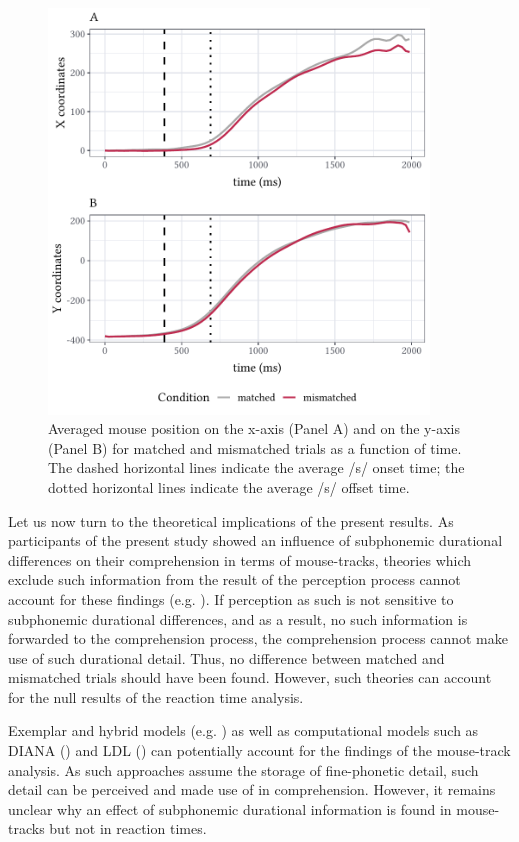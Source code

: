 \begin{figure}
    \centering
    \includegraphics[width=0.9\textwidth]{figures/fig7.12.pdf}
    \caption{Averaged mouse position on the x-axis (Panel A) and on the y-axis (Panel B) for matched and mismatched trials as a function of time. The dashed horizontal lines indicate the average /s/ onset time; the dotted horizontal lines indicate the average /s/ offset time.}
    \label{fig:7_12}
\end{figure}

Let us now turn to the theoretical implications of the present results. As participants of the present study showed an influence of subphonemic durational differences on their comprehension in terms of mouse-tracks, theories which exclude such information from the result of the perception process cannot account for these findings (e.g. \cite{Klatt1979, McClelland1986, Norris1994, Norris2008}). If perception as such is not sensitive to subphonemic durational differences, and as a result, no such information is forwarded to the comprehension process, the comprehension process cannot make use of such durational detail. Thus, no difference between matched and mismatched trials should have been found. However, such theories can account for the null results of the reaction time analysis.

Exemplar and hybrid models (e.g. \cite{Goldinger1996, Hawkins2001, Pierrehumbert2002, Hanique2013Aalders}) as well as computational models such as DIANA (\cite{tenBosch2015, tenBosch2021}) and LDL (\cite{Baayen2019}) can potentially account for the findings of the mouse-track analysis. As such approaches assume the storage of fine-phonetic detail, such detail can be perceived and made use of in comprehension. However, it remains unclear why an effect of subphonemic durational information is found in mouse-tracks but not in reaction times.


